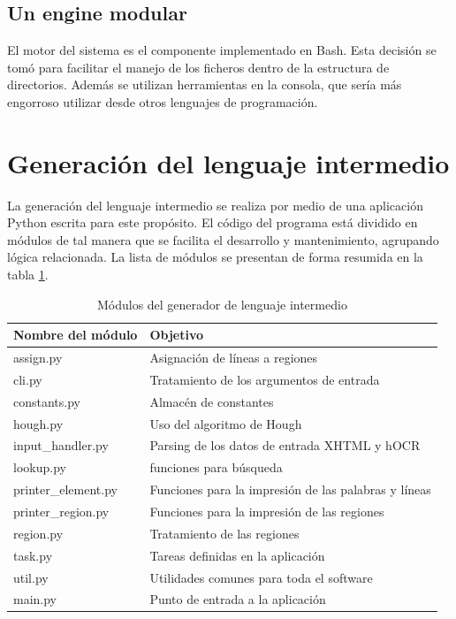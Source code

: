 \subsection{Un engine modular}

El motor del sistema es el componente implementado en Bash. Esta decisión se tomó para facilitar el manejo de los ficheros dentro de la estructura de directorios. Además se utilizan herramientas en la consola, que sería más engorroso utilizar desde otros lenguajes de programación.

\section{Generación del lenguaje intermedio}

La generación del lenguaje intermedio se realiza por medio de una aplicación Python escrita para este propósito. El código del programa está dividido en módulos de tal manera que se facilita el desarrollo y mantenimiento, agrupando lógica relacionada. La lista de módulos se presentan de forma resumida en la tabla \ref{tab:modulo-generador-codigo-intermedio}.

\begin{table}[ht]
    \centering
    \begin{tabular}{l l}
        Nombre del módulo & Objetivo \\
        \hline
        \hline
        assign.py & Asignación de líneas a regiones \\
        cli.py & Tratamiento de los argumentos de entrada \\
        constants.py & Almacén de constantes \\
        hough.py & Uso del algoritmo de Hough \\
        input\_handler.py & Parsing de los datos de entrada XHTML y hOCR \\
        lookup.py & funciones para búsqueda \\
        printer\_element.py & Funciones para la impresión de las palabras y líneas \\
        printer\_region.py & Funciones para la impresión de las regiones \\
        region.py & Tratamiento de las regiones \\
        task.py & Tareas definidas en la aplicación \\
        util.py & Utilidades comunes para toda el software \\
        main.py & Punto de entrada a la aplicación \\
    \end{tabular}
    \caption{Módulos del generador de lenguaje intermedio}    
    \label{tab:modulo-generador-codigo-intermedio}
\end{table}

